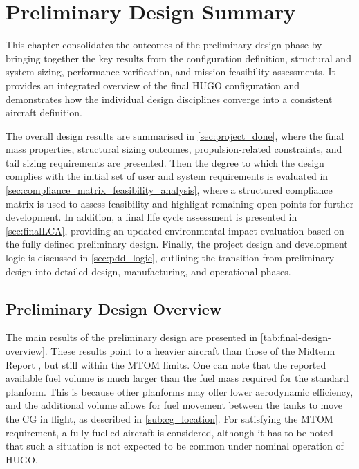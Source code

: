 \chapter{Preliminary Design Summary}
\label{ch:preliminary_design_summary}


This chapter consolidates the outcomes of the preliminary design phase by bringing together the key results from the configuration definition, structural and system sizing, performance verification, and mission feasibility assessments. It provides an integrated overview of the final HUGO configuration and demonstrates how the individual design disciplines converge into a consistent aircraft definition.

The overall design results are summarised in \autoref{sec:project_done}, where the final mass properties, structural sizing outcomes, propulsion-related constraints, and tail sizing requirements are presented. Then the degree to which the design complies with the initial set of user and system requirements is evaluated in \autoref{sec:compliance_matrix_feasibility_analysis}, where a structured compliance matrix is used to assess feasibility and highlight remaining open points for further development. In addition, a final life cycle assessment is presented in \autoref{sec:finalLCA}, providing an updated environmental impact evaluation based on the fully defined preliminary design. Finally, the project design and development logic is discussed in \autoref{sec:pdd_logic}, outlining the transition from preliminary design into detailed design, manufacturing, and operational phases.

\section{Preliminary Design Overview}
\label{sec:project_done}


The main results of the preliminary design are presented in \autoref{tab:final-design-overview}. These results point to a heavier aircraft than those of the Midterm Report , but still within the MTOM limits. One can note that the reported available fuel volume is much larger than the fuel mass required for the standard planform. This is because other planforms may offer lower aerodynamic efficiency, and the additional volume allows for fuel movement between the tanks to move the CG in flight, as described in \autoref{sub:cg_location}. For satisfying the MTOM requirement, a fully fuelled aircraft is considered, although it has to be noted that such a situation is not expected to be common under nominal operation of HUGO. 


